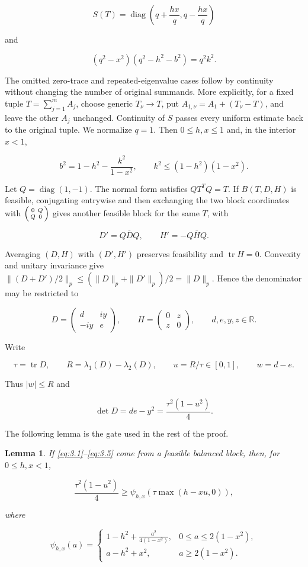 \documentclass[11pt]{article}
\newtheorem{lemma}[theorem]{Lemma}
\begin{document}
\[
S(T)=\operatorname{diag}\left(q+\frac{hx}{q},q-\frac{hx}{q}\right)
\tag{3.2}\label{eq:3.2}
\]

and

\[
(q^2-x^2)(q^2-h^2-b^2)=q^2k^2.
\tag{3.3}\label{eq:3.3}
\]

The omitted zero-trace and repeated-eigenvalue cases follow by continuity without
changing the number of original summands. More explicitly, for a fixed tuple
$T=\sum_{j=1}^mA_j$, choose generic $T_\nu\to T$, put
$A_{1,\nu}=A_1+(T_\nu-T)$, and leave the other $A_j$ unchanged. Continuity of
$S$ passes every uniform estimate back to the original tuple. We normalize
$q=1$. Then $0\le h,x\le1$ and, in the interior $x<1$,

\[
b^2=1-h^2-\frac{k^2}{1-x^2},
\qquad k^2\le(1-h^2)(1-x^2).
\tag{3.4}\label{eq:3.4}
\]

Let $Q=\operatorname{diag}(1,-1)$. The normal form satisfies $QT^TQ=T$.
If $B(T,D,H)$ is feasible, conjugating entrywise and then exchanging the two
block coordinates with $\begin{psmallmatrix}0&Q\\Q&0\end{psmallmatrix}$ gives
another feasible block for the same $T$, with

\[
D'=Q\overline DQ,
\qquad H'=-Q\overline HQ.
\]

Averaging $(D,H)$ with $(D',H')$ preserves feasibility and $\operatorname{tr}H=0$.
Convexity and unitary invariance give
$\|(D+D')/2\|_p\le(\|D\|_p+\|D'\|_p)/2=\|D\|_p$.
Hence the denominator may be restricted to

\[
D=\begin{pmatrix}d&iy\\-iy&e\end{pmatrix},
\qquad
H=\begin{pmatrix}0&z\\z&0\end{pmatrix},
\qquad d,e,y,z\in\mathbb R.
\tag{3.5}\label{eq:3.5}
\]

Write

\[
\tau=\operatorname{tr}D,
\qquad R=\lambda_1(D)-\lambda_2(D),
\qquad u=R/\tau\in[0,1],
\qquad w=d-e.
\tag{3.6}\label{eq:3.6}
\]

Thus $|w|\le R$ and

\[
\det D=de-y^2=\frac{\tau^2(1-u^2)}4.
\tag{3.7}\label{eq:3.7}
\]

The following lemma is the gate used in the rest of the proof.

\begin{lemma}
\label{lem:spectral-gate}
If \eqref{eq:3.1}--\eqref{eq:3.5} come from a feasible balanced block, then, for
$0\le h,x<1$,

\[
\frac{\tau^2(1-u^2)}4
\ge
\psi_{h,x}\!\left(\tau\max(h-xu,0)\right),
\tag{3.8}\label{eq:3.8}
\]

where

\[
\psi_{h,x}(a)=
\begin{cases}
\displaystyle 1-h^2+\frac{a^2}{4(1-x^2)},
&0\le a\le2(1-x^2),\\[7pt]
a-h^2+x^2,&a\ge2(1-x^2).
\end{cases}
\tag{3.9}\label{eq:3.9}
\]

\end{lemma}
\end{document}

